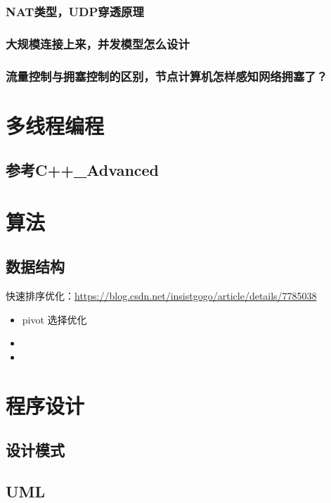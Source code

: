 \documentclass[UTF8,a4paper,8pt]{ctexart}
\begin{document}
		\subsubsection{NAT类型，UDP穿透原理}
		
		\subsubsection{大规模连接上来，并发模型怎么设计}
		
		\subsubsection{流量控制与拥塞控制的区别，节点计算机怎样感知网络拥塞了？}
		
		

\newpage
\section{多线程编程}
	\subsection{参考C++\_Advanced}

\newpage
\section{算法}
	\subsection{数据结构}
	
		快速排序优化：\url{https://blog.csdn.net/insistgogo/article/details/7785038}
			\begin{itemize}
				\item pivot 选择优化
				\item 
				\item 
			\end{itemize}
			

\newpage
\section{程序设计}
	\subsection{设计模式}
	\subsection{UML}
\end{document}

